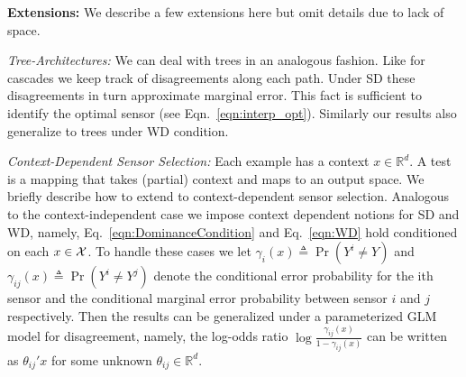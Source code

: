 


\noindent
{\bf Extensions:} We describe a few extensions here but omit details due to lack of space.

\noindent
{\it Tree-Architectures:}
We can deal with trees in an analogous fashion. Like for cascades we keep track of disagreements along each path. Under SD these disagreements in turn approximate marginal error. This fact is sufficient to identify the optimal sensor (see Eqn.~\ref{eqn:interp_opt}). Similarly our results also generalize to trees under WD condition. 

\noindent
{\it Context-Dependent Sensor Selection:}
Each example has a context $x \in \mathbb{R}^d$. A test is a mapping that takes (partial) context and maps to an output space. We briefly describe how to extend to context-dependent sensor selection. Analogous to the context-independent case we impose context dependent notions for SD and WD, namely, Eq.~\ref{eqn:DominanceCondition} and Eq.~\ref{eqn:WD} hold conditioned on each $x \in {\cal X}$. To handle these cases we let $\gamma_i(x)\triangleq \Pr(Y^{i} \neq Y)$ and $\gamma_{ij}(x) \triangleq \Pr(Y^{i} \neq Y^{j})$ denote the conditional error probability for the ith sensor and the conditional marginal error probability between sensor $i$ and $j$ respectively. Then the results can be generalized under a parameterized GLM model for disagreement, namely, the log-odds ratio $\log \frac{\gamma_{ij}(x)}{1-\gamma_{ij}(x)}$ can be written as $\theta_{ij}'x$ for some unknown $\theta_{ij} \in \mathbb{R}^d$.

